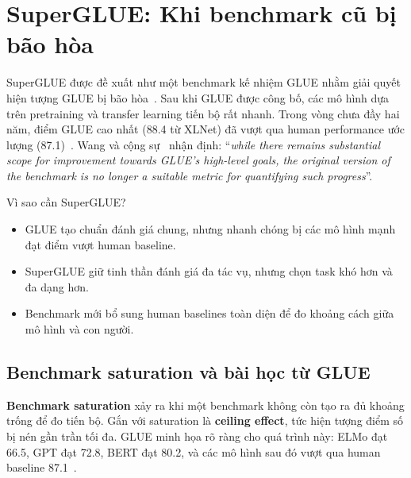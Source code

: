 
\section{SuperGLUE: Khi benchmark cũ bị bão hòa}
\label{sec:superglue}

SuperGLUE được đề xuất như một benchmark kế nhiệm GLUE nhằm giải quyết hiện tượng GLUE bị bão hòa~\cite{superglue}. Sau khi GLUE được công bố, các mô hình dựa trên pretraining và transfer learning tiến bộ rất nhanh. Trong vòng chưa đầy hai năm, điểm GLUE cao nhất (88.4 từ XLNet) đã vượt qua human performance ước lượng (87.1)~\cite{superglue}. Wang và cộng sự~\cite{superglue} nhận định: ``\textit{while there remains substantial scope for improvement towards GLUE's high-level goals, the original version of the benchmark is no longer a suitable metric for quantifying such progress}''.

\begin{summarybox}{Vì sao cần SuperGLUE?}
\begin{itemize}
    \item GLUE tạo chuẩn đánh giá chung, nhưng nhanh chóng bị các mô hình mạnh đạt điểm vượt human baseline.
    \item SuperGLUE giữ tinh thần đánh giá đa tác vụ, nhưng chọn task khó hơn và đa dạng hơn.
    \item Benchmark mới bổ sung human baselines toàn diện để đo khoảng cách giữa mô hình và con người.
\end{itemize}
\end{summarybox}

\subsection{Benchmark saturation và bài học từ GLUE}

\textbf{Benchmark saturation} xảy ra khi một benchmark không còn tạo ra đủ khoảng trống để đo tiến bộ. Gắn với saturation là \textbf{ceiling effect}, tức hiện tượng điểm số bị nén gần trần tối đa. GLUE minh họa rõ ràng cho quá trình này: ELMo đạt 66.5, GPT đạt 72.8, BERT đạt 80.2, và các mô hình sau đó vượt qua human baseline 87.1~\cite{superglue}.

